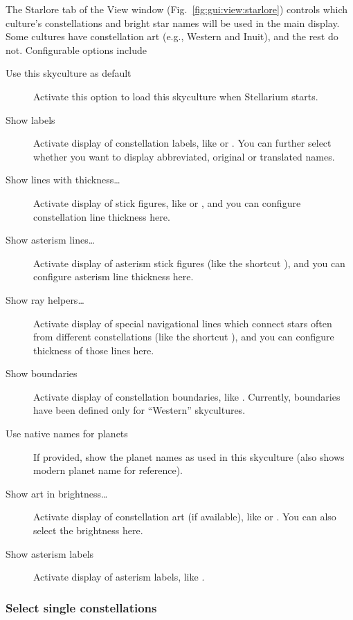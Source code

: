 The Starlore tab of the View window (Fig.~\ref{fig:gui:view:starlore})
controls which culture's constellations and bright star names will be
used in the main display.  Some cultures have constellation art (e.g.,
Western and Inuit), and the rest do not. Configurable options include
\begin{description}
\item[Use this skyculture as default] Activate this option to load
  this skyculture when Stellarium starts.
\item[Show labels] Activate display of constellation labels, like
   or . You can further
  select whether you want to display abbreviated, original or
  translated names.
\item[Show lines with thickness\ldots] Activate display of stick
  figures, like  or , and you
  can configure constellation line thickness here.
\item[Show asterism lines\ldots] Activate display of asterism stick figures   
  (like the shortcut ), and you can configure asterism line thickness here.
\item[Show ray helpers\ldots] Activate display of special navigational lines which 
  connect stars often from different constellations (like the shortcut ),
  and you can configure thickness of those lines here.
\item[Show boundaries] Activate display of constellation boundaries,
  like . Currently, boundaries have been defined only for
  ``Western'' skycultures.
\item[Use native names for planets] If provided, show the planet names
  as used in this skyculture (also shows modern planet name for
  reference). %
\item[Show art in brightness\ldots] Activate display of constellation
  art (if available), like  or
  . You can also select the brightness here.
\item[Show asterism labels] Activate display of asterism labels, like .
\end{description}

\subsubsection{Select single constellations}
\label{sec:starlore:singleConstellations}

